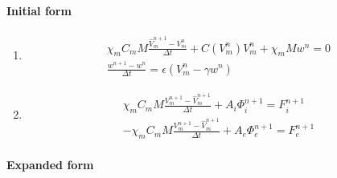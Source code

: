 \documentclass[a4paper]{article}
\begin{document}
\paragraph{Initial form}
\begin{enumerate}[label = \Roman*, align = Center]
\item 
   \begin{equation}
   \begin{gathered}
   \chi_m C_m M\frac{\hat{V}_m^{n+1} - V_m^n}{\Delta t} + C(V_m^n)V_m^n +\chi_mMw^n = 0
   \\
   \frac{w^{n+1}-w^n}{\Delta t} = \epsilon (V_m^n - \gamma w^n)
   \end{gathered}
   \end{equation}
\item 
   \begin{equation}
   \begin{gathered}
   \chi_m C_m M\frac{V_m^{n+1} - \hat{V}_m^{n+1}}{\Delta t} + A_i\Phi_i^{n+1} = F_i^{n+1} \\
   -\chi_m C_m M\frac{V_m^{n+1} - \hat{V}_m^{n+1}}{\Delta t} + A_e\Phi_e^{n+1} = F_e^{n+1}
   \end{gathered}
   \end{equation}
\end{enumerate}
\vspace{3mm}
\paragraph{Expanded form}
\end{document}
